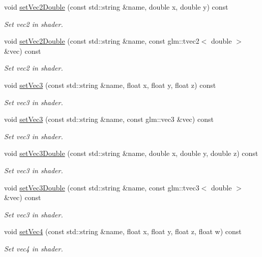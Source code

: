 \begin{DoxyCompactItemize}
void \hyperlink{class_shader_ab17dd69b4d54911646a89832b00bd43f}{set\+Vec2\+Double} (const std\+::string \&name, double x, double y) const
\begin{DoxyCompactList}\small\item\em Set vec2 in shader. \end{DoxyCompactList}\item 
void \hyperlink{class_shader_ab21e7a65481b9488dd580df1a4232b89}{set\+Vec2\+Double} (const std\+::string \&name, const glm\+::tvec2$<$ double $>$ \&vec) const
\begin{DoxyCompactList}\small\item\em Set vec2 in shader. \end{DoxyCompactList}\item 
void \hyperlink{class_shader_a90092c25b7dc23964c465b93887300f9}{set\+Vec3} (const std\+::string \&name, float x, float y, float z) const
\begin{DoxyCompactList}\small\item\em Set vec3 in shader. \end{DoxyCompactList}\item 
void \hyperlink{class_shader_a1c29287af95cfaf9ae141d542013016d}{set\+Vec3} (const std\+::string \&name, const glm\+::vec3 \&vec) const
\begin{DoxyCompactList}\small\item\em Set vec3 in shader. \end{DoxyCompactList}\item 
void \hyperlink{class_shader_ac3caac4cee7cf853b69de8bcc5fa3f23}{set\+Vec3\+Double} (const std\+::string \&name, double x, double y, double z) const
\begin{DoxyCompactList}\small\item\em Set vec3 in shader. \end{DoxyCompactList}\item 
void \hyperlink{class_shader_ad59dced2e4de7e3711fb695be2b2ce3e}{set\+Vec3\+Double} (const std\+::string \&name, const glm\+::tvec3$<$ double $>$ \&vec) const
\begin{DoxyCompactList}\small\item\em Set vec3 in shader. \end{DoxyCompactList}\item 
void \hyperlink{class_shader_ad7906b3a47e6f2d62ec79f4c871aadb1}{set\+Vec4} (const std\+::string \&name, float x, float y, float z, float w) const
\begin{DoxyCompactList}\small\item\em Set vec4 in shader. \end{DoxyCompactList}\item 

\end{DoxyCompactItemize}
